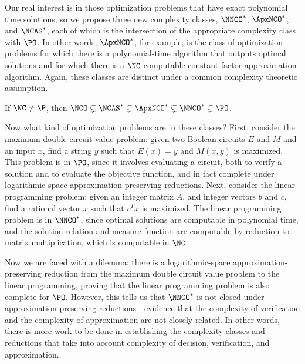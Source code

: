 \documentclass{article}
\newcommand{\todo}[1]{\textbf{TODO #1}}
\begin{document}
Our real interest is in those optimization problems that have exact polynomial time solutions, so we propose three new complexity classes, $\NNCO^*$, $\ApxNCO^*$, and $\NCAS^*$, each of which is the intersection of the appropriate complexity class with $\PO$.
In other words, $\ApxNCO^*$, for example, is the class of optimization problems for which there is a polynomial-time algorithm that outputs optimal solutions and for which there is a $\NC$-computable constant-factor approximation algorithm.
Again, these classes are distinct under a common complexity theoretic assumption.

\begin{theorem}  %
  If $\NC \neq \P$, then
    $\NCO \subsetneq \NCAS^* \subsetneq \ApxNCO^* \subsetneq \NNCO^* \subsetneq \PO$.
\end{theorem}

Now what kind of optimization problems are in these classes?
First, consider the maximum double circuit value problem: given two Boolean circuits $E$ and $M$ and an input $x$, find a string $y$ such that $E(x) = y$ and $M(x, y)$ is maximized.
This problem is in $\PO$, since it involves evaluating a circuit, both to verify a solution and to evaluate the objective function, and in fact complete under logarithmic-space approximation-preserving reductions.
Next, consider the linear programming problem: given an integer matrix $A$, and integer vectors $b$ and $c$, find a rational vector $x$ such that $c^T x$ is maximized.
The linear programming problem is in $\NNCO^*$, since optimal solutions are computable in polynomial time, and the solution relation and measure function are computable by reduction to matrix multiplication, which is computable in $\NC$.

Now we are faced with a dilemma: there is a logarithmic-space approximation-preserving reduction from the maximum double circuit value problem to the linear programming, proving that the linear programming problem is also complete for $\PO$.
However, this tells us that $\NNCO^*$ is not closed under approximation-preserving reductions---evidence that the complexity of verification and the complexity of approximation are not closely related.
In other words, there is more work to be done in establishing the complexity classes and reductions that take into account complexity of decision, verification, and approximation.
\end{document}
